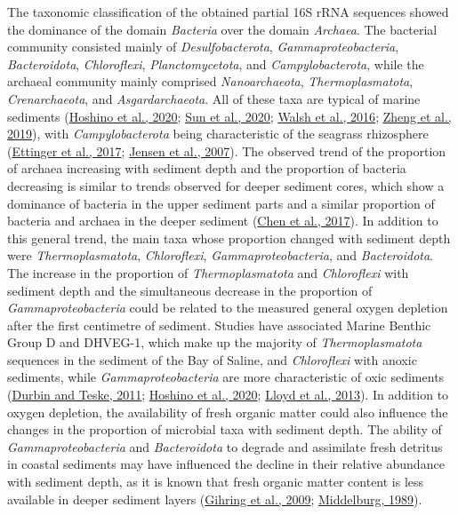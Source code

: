 \documentclass[
  12 pt,
]{book}
\begin{document}
The taxonomic classification of the obtained partial 16S rRNA sequences showed the dominance of the domain \emph{Bacteria} over the domain \emph{Archaea}. The bacterial community consisted mainly of \emph{Desulfobacterota}, \emph{Gammaproteobacteria}, \emph{Bacteroidota}, \emph{Chloroflexi}, \emph{Planctomycetota}, and \emph{Campylobacterota}, while the archaeal community mainly comprised \emph{Nanoarchaeota}, \emph{Thermoplasmatota}, \emph{Crenarchaeota}, and \emph{Asgardarchaeota}. All of these taxa are typical of marine sediments (\protect\hyperlink{ref-Hoshino2020}{Hoshino et al., 2020}; \protect\hyperlink{ref-Sun2020}{Sun et al., 2020}; \protect\hyperlink{ref-Walsh2016a}{Walsh et al., 2016}; \protect\hyperlink{ref-Zheng2019}{Zheng et al., 2019}), with \emph{Campylobacterota} being characteristic of the seagrass rhizosphere (\protect\hyperlink{ref-Ettinger2017}{Ettinger et al., 2017}; \protect\hyperlink{ref-Jensen2007}{Jensen et al., 2007}). The observed trend of the proportion of archaea increasing with sediment depth and the proportion of bacteria decreasing is similar to trends observed for deeper sediment cores, which show a dominance of bacteria in the upper sediment parts and a similar proportion of bacteria and archaea in the deeper sediment (\protect\hyperlink{ref-Chen2017}{Chen et al., 2017}). In addition to this general trend, the main taxa whose proportion changed with sediment depth were \emph{Thermoplasmatota}, \emph{Chloroflexi}, \emph{Gammaproteobacteria}, and \emph{Bacteroidota}. The increase in the proportion of \emph{Thermoplasmatota} and \emph{Chloroflexi} with sediment depth and the simultaneous decrease in the proportion of \emph{Gammaproteobacteria} could be related to the measured general oxygen depletion after the first centimetre of sediment. Studies have associated Marine Benthic Group D and DHVEG-1, which make up the majority of \emph{Thermoplasmatota} sequences in the sediment of the Bay of Saline, and \emph{Chloroflexi} with anoxic sediments, while \emph{Gammaproteobacteria} are more characteristic of oxic sediments (\protect\hyperlink{ref-Durbin2011}{Durbin and Teske, 2011}; \protect\hyperlink{ref-Hoshino2020}{Hoshino et al., 2020}; \protect\hyperlink{ref-Lloyd2013}{Lloyd et al., 2013}). In addition to oxygen depletion, the availability of fresh organic matter could also influence the changes in the proportion of microbial taxa with sediment depth. The ability of \emph{Gammaproteobacteria} and \emph{Bacteroidota} to degrade and assimilate fresh detritus in coastal sediments may have influenced the decline in their relative abundance with sediment depth, as it is known that fresh organic matter content is less available in deeper sediment layers (\protect\hyperlink{ref-Gihring2009}{Gihring et al., 2009}; \protect\hyperlink{ref-Middelburg1989}{Middelburg, 1989}).
\end{document}
